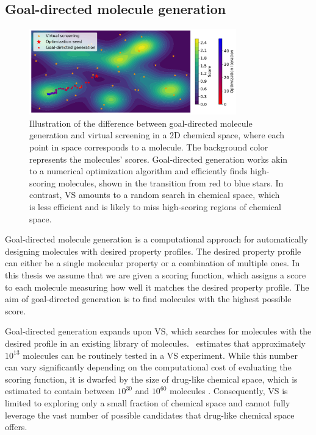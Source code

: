 \subsection{Goal-directed molecule generation}
\begin{figure}
    \centering
    \includegraphics[width=0.8\textwidth]{./figures/goal_directed_generation_vs.pdf}
    \caption{Illustration of the difference between goal-directed molecule generation and virtual
        screening in a 2D chemical space, where each point in space corresponds to a molecule. The
        background color represents the molecules' scores. Goal-directed generation works
        akin to a numerical optimization algorithm and efficiently finds high-scoring molecules,
        shown in the transition from red to blue stars. In contrast, VS amounts to a random search in chemical space, which is less efficient
        and is likely to miss high-scoring regions of chemical space. \label{fig:goal-directed-generation}}
\end{figure}

Goal-directed molecule generation \citep{schneiderNovoMolecularDesign2013} is a computational
approach for automatically designing molecules with desired property profiles. The desired
property profile can either be a single molecular property or a combination of multiple ones.
In this thesis we assume that we are given a scoring function, which assigns a score to each molecule
measuring how well it matches the desired property profile. The aim of goal-directed generation is
to find molecules with the highest possible score.

Goal-directed generation expands upon \ac{VS}, which searches for molecules with the desired profile
in an existing library of molecules.\ \citet{waltersVirtualChemicalLibraries2019} estimates that approximately
$10^{13}$ molecules can be routinely tested in a \ac{VS} experiment. While this number can vary
significantly depending on the computational cost of evaluating the scoring function, it is dwarfed
by the size of drug-like chemical space, which is estimated to contain between $10^{30}$ and
$10^{60}$ molecules \citep{waltersVirtualChemicalLibraries2019,ruddigkeitEnumeration166Billion2012}.
Consequently, \ac{VS} is limited to exploring only a small fraction of chemical space and cannot
fully leverage the vast number of possible candidates that drug-like chemical space offers.

